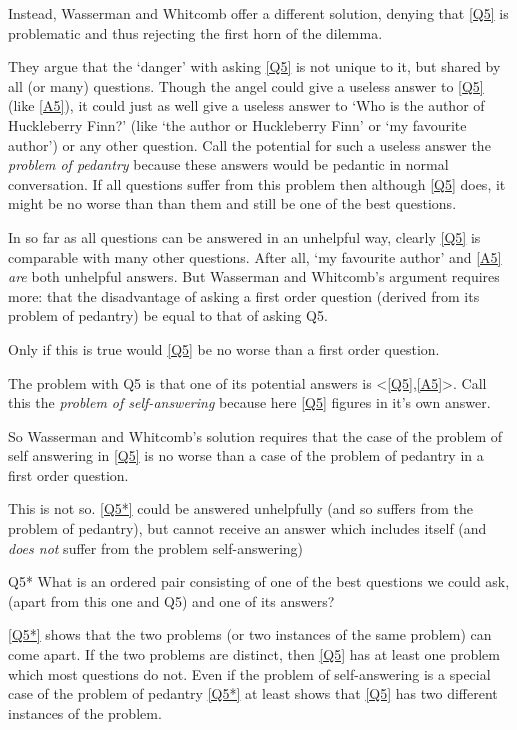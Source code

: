 Instead, Wasserman and Whitcomb offer a different solution, denying that \ref{Q5} is problematic and thus rejecting the first horn of the dilemma.

They argue that the `danger' with asking \ref{Q5} is not unique to it, but shared by all (or many) questions. 
Though the angel could give a useless answer to \ref{Q5} (like \ref{A5}), it could just as well give a useless answer to `Who is the author of Huckleberry Finn?' (like `the author or Huckleberry Finn' or `my favourite author') or any other question.
Call the potential for such a useless answer the \textit{problem of pedantry} because these answers would be pedantic in normal conversation.
If all questions suffer from this problem then although \ref{Q5} does, it might be no worse than than them and still be one of the best questions.

In so far as all questions can be answered in an unhelpful way, clearly \ref{Q5} is comparable with many other questions.
After all, `my favourite author' and \ref{A5} \emph{are} both unhelpful answers.
But Wasserman and Whitcomb's argument requires more: that the disadvantage of asking a first order question (derived from its problem of pedantry) be equal to that of asking Q5.

Only if this is true would \ref{Q5} be no worse than a first order question.

The problem with Q5 is that one of its potential answers is <\ref{Q5},\ref{A5}>.
Call this the \textit{problem of self-answering} because here \ref{Q5} figures in it's own answer.

So Wasserman and Whitcomb's solution requires that the case of the problem of self answering in \ref{Q5} is no worse than a case of the problem of pedantry in a first order question.

This is not so.
\ref{Q5*} could be answered unhelpfully (and so suffers from the problem of pedantry), but cannot receive an answer which includes itself (and \emph{does not} suffer from the problem self-answering)

	\begin{principle}{Q5*}\label{Q5*}
	What is an ordered pair consisting of one of the best questions we could ask, (apart from this one and Q5) and one of its answers?
	\end{principle}

\ref{Q5*} shows that the two problems (or two instances of the same problem) can come apart.
If the two problems are distinct, then \ref{Q5} has at least one problem which most questions do not.
Even if the problem of self-answering is a special case of the problem of pedantry \ref{Q5*} at least shows that \ref{Q5} has two different instances of the problem.

